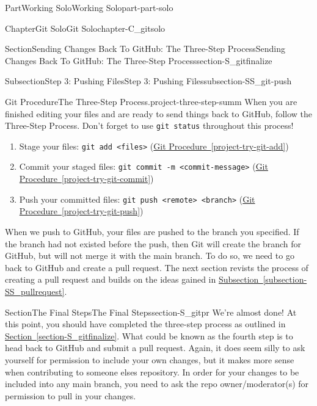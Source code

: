 \documentclass[oneside,10pt,]{book}
\newcommand{\xreffont}{\relax}
\newcommand{\mono}[1]{\texttt{#1}}
\begin{document}
\begin{partptx}{Part}{Working Solo}{}{Working Solo}{}{}{part-part-solo}
\begin{chapterptx}{Chapter}{Git Solo}{}{Git Solo}{}{}{chapter-C_gitsolo}
\begin{sectionptx}{Section}{Sending Changes Back To GitHub: The Three-Step Process}{}{Sending Changes Back To GitHub: The Three-Step Process}{}{}{section-S_gitfinalize}
\begin{subsectionptx}{Subsection}{Step 3: Pushing Files}{}{Step 3: Pushing Files}{}{}{subsection-SS_git-push}
\begin{project}{Git Procedure}{The Three-Step Process.}{project-three-step-summ}%
%
%
When you are finished editing your files and are ready to send things back to GitHub, follow the Three-Step Process. Don't forget to use \mono{git status} throughout this process!%
\begin{enumerate}
\item{}Stage your files: \mono{git add <files>} (\hyperref[project-try-git-add]{Git Procedure~{\xreffont\ref{project-try-git-add}}})%
\item{}Commit your staged files: \mono{git commit -m \textquotedbl{}<commit-message>\textquotedbl{}} (\hyperref[project-try-git-commit]{Git Procedure~{\xreffont\ref{project-try-git-commit}}})%
\item{}Push your committed files: \mono{git push <remote> <branch>} (\hyperref[project-try-git-push]{Git Procedure~{\xreffont\ref{project-try-git-push}}})%
\end{enumerate}
%
\end{project}%
\end{subsectionptx}
\begin{conclusion}{}%
When we push to GitHub, your files are pushed to the branch you specified. If the branch had not existed before the push, then Git will create the branch for GitHub, but will not merge it with the main branch. To do so, we need to go back to GitHub and create a pull request. The next section revists the process of creating a pull request and builds on the ideas gained in \hyperref[subsection-SS_pullrequest]{Subsection~{\xreffont\ref{subsection-SS_pullrequest}}}.%
\end{conclusion}%
\end{sectionptx}
%
%
\typeout{************************************************}
\typeout{************************************************}
%
\begin{sectionptx}{Section}{The Final Steps}{}{The Final Steps}{}{}{section-S_gitpr}
%
%
%
We're almost done! At this point, you should have completed the three-step process as outlined in \hyperref[section-S_gitfinalize]{Section~{\xreffont\ref{section-S_gitfinalize}}}. What could be known as the fourth step is to head back to GitHub and submit a pull request. Again, it does seem silly to ask yourself for permission to include your own changes, but it makes more sense when contributing to someone elses repository. In order for your changes to be included into any main branch, you need to ask the repo owner\slash{}moderator(s) for permission to pull in your changes.%

\end{sectionptx}
\end{chapterptx}
\end{partptx}
\end{document}
